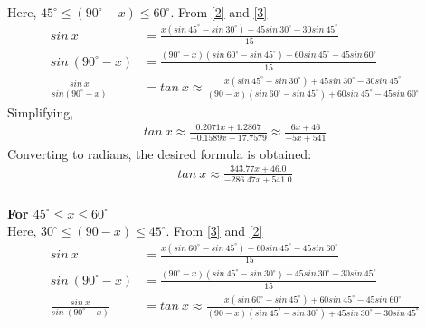 \documentclass[12pt,twoside, letterpaper, margin=1in]{article}
\begin{document}
Here, $45^\circ \leq (90^\circ-x) \leq 60^\circ$. From \eqref{2} and \eqref{3}\\
\begin{align*}
sin~x &= \frac{x(sin~45^\circ - sin~30^\circ) + 45sin~30^\circ -30 sin~45^\circ}{15}\\
sin~(90^\circ-x) &= \frac{(90^\circ-x)(sin~60^\circ - sin~45^\circ) + 60sin~45^\circ -45 sin~60^\circ}{15}\\
\frac{sin~x}{sin(90^\circ-x)}&=tan~x \approx \frac{x(sin~45^\circ - sin~30^\circ) + 45sin~30^\circ -30 sin~45^\circ}{(90-x)(sin~60^\circ - sin~45^\circ) + 60sin~45^\circ -45 sin~60^\circ}
\end{align*}
\vspace{1.5pt}
Simplifying,
\\
\vspace{1.5pt}
\begin{align}
tan~x \approx \frac{0.2071x+1.2867}{-0.1589x+17.7579} \approx \frac{6x+46}{-5x+541} \label{6}
\end{align}
Converting to radians, the desired formula is obtained:
\\
\vspace{1.5pt}
\begin{align}
tan~x \approx \frac{343.77 x + 46.0}{-286.47 x + 541.0} 
\end{align}
\\
\textbf{For $45^\circ \leq x \leq 60^\circ$ }\\
\vspace{1.5pt}
Here, $30^\circ \leq (90-x) \leq 45^\circ$. From \eqref{3} and \eqref{2}\\
\begin{align*}
sin~x &= \frac{x(sin~60^\circ - sin~45^\circ) + 60sin~45^\circ -45 sin~60^\circ}{15}\\
sin~(90^\circ-x) &= \frac{(90^\circ-x)(sin~45^\circ - sin~30^\circ) + 45sin~30^\circ -30 sin~45^\circ}{15}\\
\frac{sin~x}{sin~(90^\circ-x)} &= tan~x \approx \frac{x(sin~60^\circ - sin~45^\circ) + 60sin~45^\circ -45 sin~60^\circ}{(90-x)(sin~45^\circ - sin~30^\circ) + 45sin~30^\circ -30 sin~45^\circ} 
\end{align*}
\vspace{1.5pt}
\end{document}
